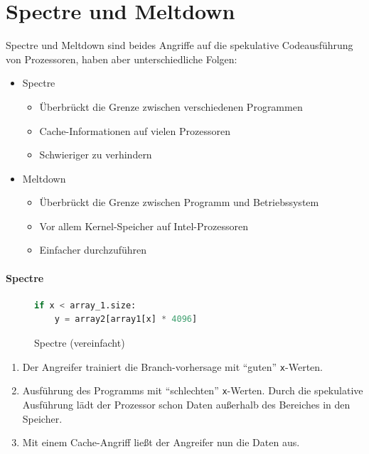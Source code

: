 \documentclass[a4paper, 11pt, accentcolor = tud3b]{tudreport}
\begin{document}
        \section{Spectre und Meltdown}
            Spectre und Meltdown sind beides Angriffe auf die spekulative Codeausführung von Prozessoren, haben aber unterschiedliche Folgen:
            \begin{itemize}
            	\item Spectre
	            	\begin{itemize}
	            		\item Überbrückt die Grenze zwischen verschiedenen Programmen
	            		\item Cache-Informationen auf vielen Prozessoren
	            		\item Schwieriger zu verhindern
	            	\end{itemize}
            	\item Meltdown
					\begin{itemize}
						\item Überbrückt die Grenze zwischen Programm und Betriebssystem
						\item Vor allem Kernel-Speicher auf Intel-Prozessoren
						\item Einfacher durchzuführen
					\end{itemize}
            \end{itemize}
        
	        \paragraph{Spectre}
		        \begin{figure}[H]
		        	\centering
		        	\begin{lstlisting}[language = Python]
if x < array_1.size:
	y = array2[array1[x] * 4096]
\end{lstlisting}
		        	\caption{Spectre (vereinfacht)}
		        \end{figure}
		        \begin{enumerate}
		        	\item Der Angreifer trainiert die Branch-vorhersage mit \enquote{guten} \texttt{x}-Werten.
		        	\item Ausführung des Programms mit \enquote{schlechten} \texttt{x}-Werten. Durch die spekulative Ausführung lädt der Prozessor schon Daten außerhalb des Bereiches in den Speicher.
		        	\item Mit einem Cache-Angriff ließt der Angreifer nun die Daten aus.
		        \end{enumerate}
	        
\end{document}
